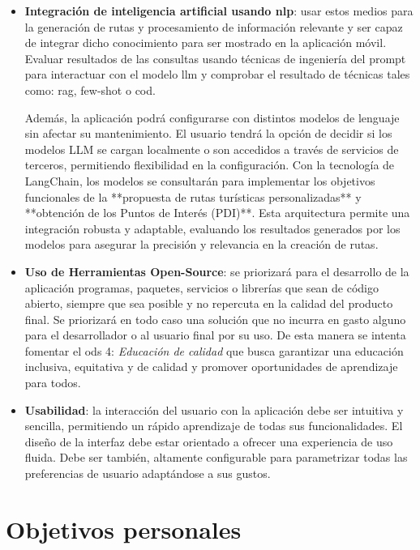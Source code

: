 \begin{itemize}
	\item \textbf{Integración de inteligencia artificial usando \acrfull{nlp}}: usar estos medios para la generación de rutas y procesamiento de información relevante y ser capaz de integrar dicho conocimiento para ser mostrado en la aplicación móvil. Evaluar resultados de las consultas usando técnicas de ingeniería del prompt para interactuar con el modelo \acrshort{llm} y comprobar el resultado de técnicas tales como: \acrfull{rag}, few-shot o \acrfull{cod}. 

	
	Además, la aplicación podrá configurarse con distintos modelos de lenguaje sin afectar su mantenimiento. El usuario tendrá la opción de decidir si los modelos LLM se cargan localmente o son accedidos a través de servicios de terceros, permitiendo flexibilidad en la configuración. Con la tecnología de LangChain, los modelos se consultarán para implementar los objetivos funcionales de la **propuesta de rutas turísticas personalizadas** y **obtención de los Puntos de Interés (PDI)**. Esta arquitectura permite una integración robusta y adaptable, evaluando los resultados generados por los modelos para asegurar la precisión y relevancia en la creación de rutas.
    \item \textbf{Uso de Herramientas Open-Source}: se priorizará para el desarrollo de la aplicación programas, paquetes, servicios o librerías que sean de código abierto, siempre que sea posible y no repercuta en la calidad del producto final. Se priorizará en todo caso una solución que no incurra en gasto alguno para el desarrollador o al usuario final por su uso. De esta manera se intenta fomentar el \acrshort{ods} 4: \textit{Educación de calidad} que busca garantizar una educación inclusiva, equitativa y de calidad y promover oportunidades de aprendizaje para todos.
    \item \textbf{Usabilidad}: la interacción del usuario con la aplicación debe ser intuitiva y sencilla, permitiendo un rápido aprendizaje de todas sus funcionalidades. El diseño de la interfaz debe estar orientado a ofrecer una experiencia de uso fluida. Debe ser también, altamente configurable para parametrizar todas las preferencias de usuario adaptándose a sus gustos.
\end{itemize}

\section{Objetivos personales}


